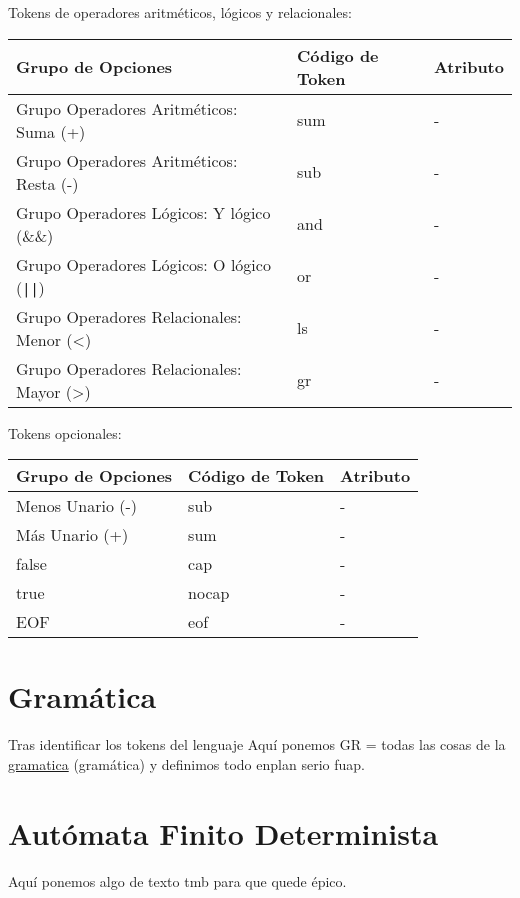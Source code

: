 \documentclass{article}
\begin{document}
Tokens de operadores aritméticos, lógicos y relacionales:
\begin{table}[h!]
    \centering
    \begin{tabular}{|l|l|l|}
        \hline
        \textbf{Grupo de Opciones} & \textbf{Código de Token} & \textbf{Atributo} \\ \hline
        Grupo Operadores Aritméticos: Suma (+) & sum & - \\ \hline
        Grupo Operadores Aritméticos: Resta (-) & sub & - \\ \hline
        Grupo Operadores Lógicos: Y lógico (\&\&) & and & - \\ \hline
        Grupo Operadores Lógicos: O lógico (\texttt{||}) & or & - \\ \hline
        Grupo Operadores Relacionales: Menor (<) & ls & - \\ \hline
        Grupo Operadores Relacionales: Mayor (>) & gr & - \\ \hline
    \end{tabular}
\end{table}

Tokens opcionales:
\begin{table}[h!]
    \centering
    \begin{tabular}{|l|l|l|}
        \hline
        \textbf{Grupo de Opciones} & \textbf{Código de Token} & \textbf{Atributo} \\ \hline
        Menos Unario (-) & sub & - \\ \hline
        Más Unario (+) & sum & - \\ \hline
        false & cap & - \\ \hline
        true & nocap & - \\ \hline
        EOF & eof & - \\ \hline
    \end{tabular}
\end{table}




\section{Gramática}
Tras identificar los tokens del lenguaje 
Aquí ponemos GR = {todas las cosas de la \underline{gramatica} (gramática)} y definimos todo enplan serio fuap.

\section{Autómata Finito Determinista}
Aquí ponemos algo de texto tmb para que quede épico.
\end{document}
